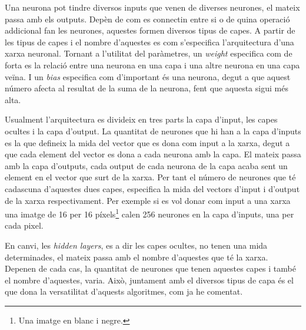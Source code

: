 Una neurona pot tindre diversos inputs que venen de diverses neurones, el mateix passa amb els outputs. Depèn de com es connectin entre si o de quina operació addicional fan les neurones, aquestes formen diversos tipus de capes. A partir de les tipus de capes i el nombre d'aquestes es com s'especifica l'arquitectura d'una xarxa neuronal. Tornant a l'utilitat del paràmetres, un \textit{weight} especifica com de forta es la relació entre una neurona en una capa i una altre neurona en una capa veïna. I un \textit{bias} especifica com d'important és una neurona, degut a que aquest número afecta al resultat de la suma de la neurona, fent que aquesta sigui més alta.

Usualment l'arquitectura es divideix en tres parts la capa d'input, les capes ocultes i la capa d'output. La quantitat de neurones que hi han a la capa d'inputs es la que defineix la mida del vector que es dona com input a la xarxa, degut a que cada element del vector es dona a cada neurona amb la capa. El mateix passa amb la capa d'outputs, cada output de cada neurona de la capa acaba sent un element en el vector que surt de la xarxa. Per tant el número de neurones que té cadascuna d'aquestes dues capes, especifica la mida del vectors d'input i d'output de la xarxa respectivament. Per exemple si es vol donar com input a una xarxa una imatge de 16 per 16 píxels\footnote{Una imatge en blanc i negre.} calen 256 neurones en la capa d'inputs, una per cada pixel. 

En canvi, les \textit{hidden layers}, es a dir les capes ocultes, no tenen una mida determinades, el mateix passa amb el nombre d'aquestes que té la xarxa. Depenen de cada cas, la quantitat de neurones que tenen aquestes capes i també el nombre d'aquestes, varia. Això, juntament amb el diversos tipus de capa és el que dona la versatilitat d'aquests algoritmes, com ja he comentat. 
 
